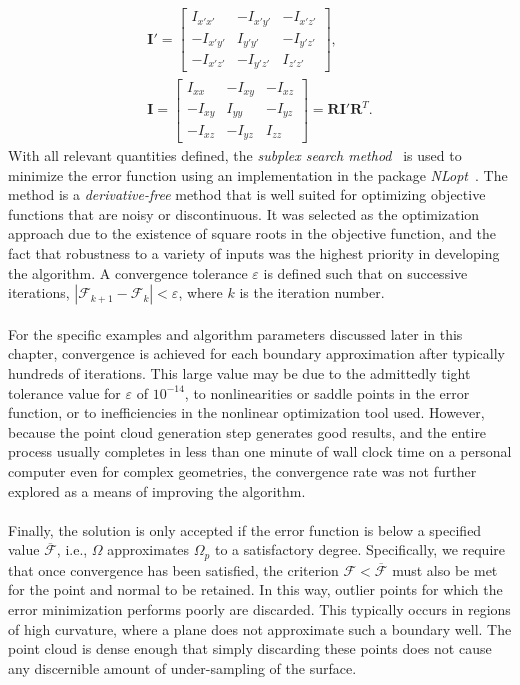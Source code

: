 \begin{gather}
\bm{I}' = \left[\begin{array} {ccc} {I_{x'x'}} & {-I_{x'y'}} & {-I_{x'z'}}\\ {-I_{x'y'}} & {I_{y'y'}} & {-I_{y'z'}} \\ -{I_{x'z'}} & {-I_{y'z'}} & {I_{z'z'}} \end{array} \right], \\
\bm{I} = \left[\begin{array} {ccc} {I_{xx}} & {-I_{xy}} & {-I_{xz}}\\ {-I_{xy}} & {I_{yy}} & {-I_{yz}} \\ -{I_{xz}} & {-I_{yz}} & {I_{zz}} \end{array} \right] = \bm{R}\bm{I}'\mathbf{R}^T.
\end{gather}
\noindent With all relevant quantities defined, the \textit{subplex search method}~\cite{rowan} is used to minimize the error function using an implementation in the package \textit{NLopt}~\cite{nlo}. The method is a \textit{derivative-free} method that is well suited for optimizing objective functions that are noisy or discontinuous. It was selected as the optimization approach due to the existence of square roots in the objective function, and the fact that robustness to a variety of inputs was the highest priority in developing the algorithm. A convergence tolerance $\varepsilon$ is defined such that on successive iterations, $\left| \mathcal{F}_{k+1} - \mathcal{F}_{k}\right| < \varepsilon$, where $k$ is the iteration number. \\ \\
%
For the specific examples and algorithm parameters discussed later in this chapter, convergence is achieved for each boundary approximation after typically hundreds of iterations. This large value may be due to the admittedly tight tolerance value for $\varepsilon$ of $10^{-14}$, to nonlinearities or saddle points in the error function, or to inefficiencies in the nonlinear optimization tool used. However, because the point cloud generation step generates good results, and the entire process usually completes in less than one minute of wall clock time on a personal computer even for complex geometries, the convergence rate was not further explored as a means of improving the algorithm. \\ \\
%
Finally, the solution is only accepted if the error function is below a specified value $\overline{\mathcal{F}}$, i.e., $\Omega$ approximates $\Omega_p$ to a satisfactory degree. Specifically, we require that once convergence has been satisfied, the criterion $\mathcal{F} < \overline{\mathcal{F}}$ must also be met for the point and normal to be retained. In this way, outlier points for which the error minimization performs poorly are discarded. This typically occurs in regions of high curvature, where a plane does not approximate such a boundary well. The point cloud is dense enough that simply discarding these points does not cause any discernible amount of under-sampling of the surface. \\ \\
